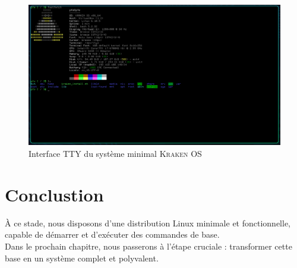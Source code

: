 \begin{figure}[H]
    \centering
    \includegraphics[width=1\textwidth]{images_pfe/corebuildresult.png}
    \caption{Interface TTY du système minimal \textsc{Kraken OS}}
    \label{fig:tty}
\end{figure}

\section{Conclustion}
À ce stade, nous disposons d’une distribution Linux minimale et fonctionnelle, capable de démarrer et d’exécuter des commandes de base.\\
Dans le prochain chapitre, nous passerons à l’étape cruciale : transformer cette base en un système complet et polyvalent.